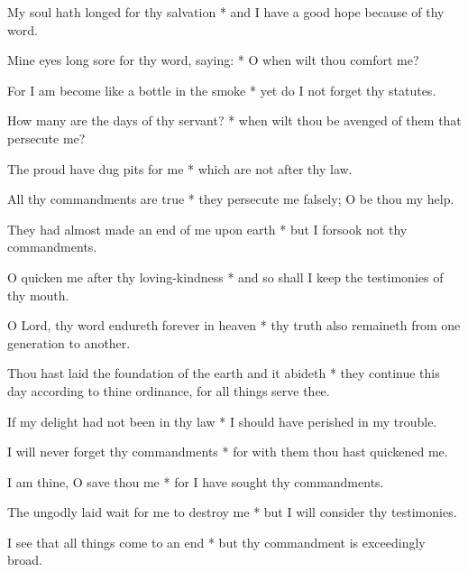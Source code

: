 My soul hath longed for thy salvation * and I have a good hope because of thy word.

Mine eyes long sore for thy word, saying: * O when wilt thou comfort me?

For I am become like a bottle in the smoke * yet do I not forget thy statutes.

How many are the days of thy servant? * when wilt thou be avenged of them that persecute me?

The proud have dug pits for me * which are not after thy law.

All thy commandments are true * they persecute me falsely; O be thou my help.

They had almost made an end of me upon earth * but I forsook not thy commandments.

O quicken me after thy loving-kindness * and so shall I keep the testimonies of thy mouth.

O Lord, thy word endureth forever in heaven * thy truth also remaineth from one generation to another.

Thou hast laid the foundation of the earth and it abideth * they continue this day according to thine ordinance, for all things serve thee.

If my delight had not been in thy law * I should have perished in my trouble.

I will never forget thy commandments * for with them thou hast quickened me.

I am thine, O save thou me * for I have sought thy commandments.

The ungodly laid wait for me to destroy me * but I will consider thy testimonies.

I see that all things come to an end * but thy commandment is exceedingly broad.